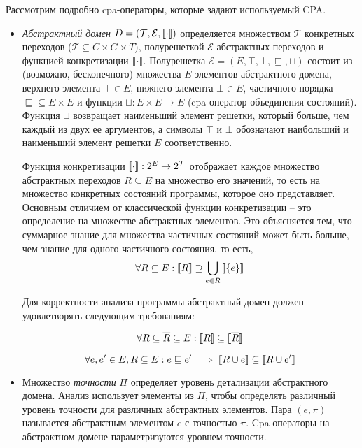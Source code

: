 Рассмотрим подробно cpa-операторы, которые задают используемый CPA.

\begin{itemize}

\item \emph{Абстрактный домен}  $D=(\mathcal{T}, \mathcal{E},[\![ \cdot ]\!])$ определяется множеством $\mathcal{T}$ конкретных переходов ($\mathcal{T} \subseteq C \times G \times T$), полурешеткой $\mathcal{E}$ абстрактных переходов и функцией конкретизации $[\![ \cdot ]\!]$.
Полурешетка 
$\mathcal{E}=(E, \top, \bot, \sqsubseteq, \sqcup)$ состоит из (возможно, бесконечного) множества $E$ элементов абстрактного домена, верхнего элемента $\top \in E$, нижнего элемента $\bot \in E$, частичного порядка $\sqsubseteq \subseteq E \times E$ и функции $\sqcup:E \times E \rightarrow E$ (cpa-оператор объединения состояний).
Функция $\sqcup$ возвращает наименьший элемент решетки, который больше, чем каждый из двух ее аргументов, а символы $\top$ и $\bot$ обозначают наибольший и наименьший элемент решетки $E$ соответственно. 

Функция конкретизации $[\![ \cdot ]\!]: 2^E \rightarrow 2^\mathcal{T}$ отображает каждое множество абстрактных переходов $R \subseteq E$ на множество его значений, то есть на множество конкретных состояний программы, которое оно представляет.
Основным отличием от классической функции конкретизации – это определение на множестве абстрактных элементов.
Это объясняется тем, что суммарное знание для множества частичных состояний может быть больше, чем знание для одного частичного состояния, то есть,  
$$\forall R\subseteq E: [\![ R ]\!] \supseteq \bigcup_{e\in R}{[\![ \{e\} ]\!]}$$

Для корректности анализа программы абстрактный домен должен удовлетворять следующим требованиям:

\begin{equation}
\label{cpa_conc_eq_0}
\forall R \subseteq \overline{R} \subseteq E: [\![ R ]\!] \subseteq [\![ \overline R ]\!]
\end{equation}

\begin{equation}
\label{cpa_conc_eq_2}
\forall e, e' \in E, R \subseteq E : e \sqsubseteq e' \implies [\![ R \cup e ]\!] \subseteq [\![ R \cup e' ]\!]
\end{equation}

\item Множество \emph{точности} $\Pi$ определяет уровень детализации абстрактного домена. 
Анализ использует элементы из $\Pi$, чтобы определять различный уровень точности для различных абстрактных элементов.
Пара $(e, \pi)$ называется абстрактным элементом $e$ с точностью $\pi$.
Cpa-операторы на абстрактном домене параметризуются уровнем точности.


\end{itemize}
